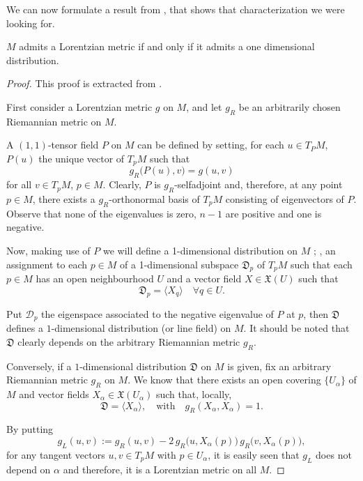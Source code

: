 We can now formulate a result from \cite{greub72}, that shows that characterization we were looking for.

\begin{proposition}
	\label{pro:onedimensional}
	$M$ admits a Lorentzian metric if and only if it admits a one dimensional distribution.
\end{proposition}

\begin{proof}
	This proof is extracted from \cite[p. 204]{romero10}.
	
	First consider a Lorentzian metric $g$ on $M$, and let $g_R$ be an arbitrarily chosen Riemannian metric on $M$.
	
	A $(1,1)$-tensor field $P$ on $M$ can be defined by setting, for each $u \in T_PM$, $P(u)$ the unique vector of $T_pM$ such that
	\[
	g_R\big(P(u),v\big)=g(u,v)
	\]
	for all $v \in T_pM$, $p \in M$. Clearly, $P$ is $g_R$-selfadjoint and, therefore, at any point $p \in M$, there exists a $g_R$-orthonormal basis of $T_pM$ consisting of eigenvectors of $P$. Observe that none of the eigenvalues is zero, $n-1$ are positive and one is negative.
	
	Now, making use of $P$ we will define a 1-dimensional distribution on $M$ \cite{kobnom63}; \ie, an assignment to each $p \in M$ of a 1-dimensional subspace $\mathfrak{D}_p$ of $T_p M$ such that each $p\in M$ has an open neighbourhood $U$ and a vector field $X \in \mathfrak{X}(U)$ such that 
	\[
	\mathfrak{D}_p = \langle X_q \rangle \quad \forall q \in U.
	\]
	
	Put $\mathcal{D}_p$ the eigenspace associated to the negative eigenvalue of $P$ at $p$, then $\mathfrak{D}$ defines a $1$-dimensional distribution (or line field) on $M$. It should be noted that $\mathfrak{D}$ clearly depends on the arbitrary Riemannian metric $g_R$.
	
	Conversely, if a $1$-dimensional distribution $\mathfrak{D}$ on $M$ is given, fix an arbitrary Riemannian metric $g_R$ on $M$. We know that there exists an open covering $\{U_{\alpha}\}$ of $M$ and vector fields $X_\alpha \in \mathfrak{X}(U_\alpha)$ such that, locally,
	\[
	\mathfrak{D}=\langle X_{\alpha} \rangle, \quad \mathrm{with} \quad
	g_R(X_{\alpha},X_{\alpha})=1.
	\]
	
	By putting
	\[
	g_{L}(u,v):=g_{R}(u,v)-2\,g_{R}\big(u,X_{\alpha}(p)\big)\,g_{R}\big(v,X_{\alpha}(p)\big),
	\]
	for any tangent vectors $u,v \in T_{p}M$ with $p\in U_\alpha$, it is easily seen that $g_{L}$ does not depend on $\alpha$ and therefore, it is a Lorentzian metric on all $M$.
\end{proof}

